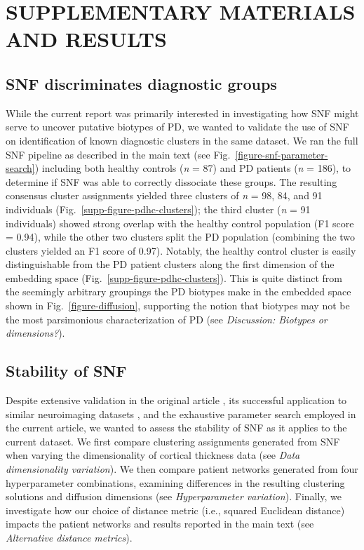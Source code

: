 \documentclass[12pt,aps,pra,reprint,showkeys]{revtex4-1}
\newcommand{\beginsupplement}{
  \setcounter{table}{0} \renewcommand{\thetable}{S\arabic{table}}
  \setcounter{figure}{0} \renewcommand{\thefigure}{S\arabic{figure}}
}
\begin{document}


\clearpage

\beginsupplement

\section*{SUPPLEMENTARY MATERIALS AND RESULTS}

\subsection*{SNF discriminates diagnostic groups}

While the current report was primarily interested in investigating how SNF might serve to uncover putative biotypes of PD, we wanted to validate the use of SNF on identification of known diagnostic clusters in the same dataset.
We ran the full SNF pipeline as described in the main text (see Fig.~\ref{figure-snf-parameter-search}) including both healthy controls (\emph{n} = 87) and PD patients (\emph{n} = 186), to determine if SNF was able to correctly dissociate these groups.
The resulting consensus cluster assignments yielded three clusters of \emph{n} = 98, 84, and 91 individuals (Fig.~\ref{supp-figure-pdhc-clusters}); the third cluster (\emph{n} = 91 individuals) showed strong overlap with the healthy control population (F1 score = 0.94), while the other two clusters split the PD population (combining the two clusters yielded an F1 score of 0.97).
Notably, the healthy control cluster is easily distinguishable from the PD patient clusters along the first dimension of the embedding space (Fig.~\ref{supp-figure-pdhc-clusters}).
This is quite distinct from the seemingly arbitrary groupings the PD biotypes make in the embedded space shown in Fig.~\ref{figure-diffusion}, supporting the notion that biotypes may not be the most parsimonious characterization of PD (see \emph{Discussion: Biotypes or dimensions?}).

\subsection*{Stability of SNF}

Despite extensive validation in the original article \citep{wang2014similarity}, its successful application to similar neuroimaging datasets \citep{stefanik2018brain, jacobs2020integration}, and the exhaustive parameter search employed in the current article, we wanted to assess the stability of SNF as it applies to the current dataset.
We first compare clustering assignments generated from SNF when varying the dimensionality of cortical thickness data (see \textit{Data dimensionality variation}).
We then compare patient networks generated from four hyperparameter combinations, examining differences in the resulting clustering solutions and diffusion dimensions (see \textit{Hyperparameter variation}).
Finally, we investigate how our choice of distance metric (i.e., squared Euclidean distance) impacts the patient networks and results reported in the main text (see \textit{Alternative distance metrics}).
\end{document}
